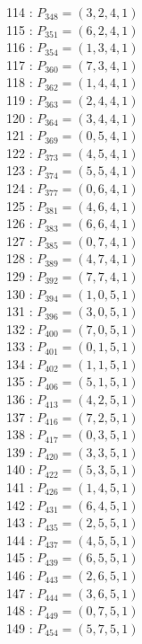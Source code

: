 \documentclass{article}
\begin{document}
{\begin{multicols}{3}
114 : $P_{348}=( 3, 2, 4, 1 )$\\
115 : $P_{351}=( 6, 2, 4, 1 )$\\
116 : $P_{354}=( 1, 3, 4, 1 )$\\
117 : $P_{360}=( 7, 3, 4, 1 )$\\
118 : $P_{362}=( 1, 4, 4, 1 )$\\
119 : $P_{363}=( 2, 4, 4, 1 )$\\
120 : $P_{364}=( 3, 4, 4, 1 )$\\
121 : $P_{369}=( 0, 5, 4, 1 )$\\
122 : $P_{373}=( 4, 5, 4, 1 )$\\
123 : $P_{374}=( 5, 5, 4, 1 )$\\
124 : $P_{377}=( 0, 6, 4, 1 )$\\
125 : $P_{381}=( 4, 6, 4, 1 )$\\
126 : $P_{383}=( 6, 6, 4, 1 )$\\
127 : $P_{385}=( 0, 7, 4, 1 )$\\
128 : $P_{389}=( 4, 7, 4, 1 )$\\
129 : $P_{392}=( 7, 7, 4, 1 )$\\
130 : $P_{394}=( 1, 0, 5, 1 )$\\
131 : $P_{396}=( 3, 0, 5, 1 )$\\
132 : $P_{400}=( 7, 0, 5, 1 )$\\
133 : $P_{401}=( 0, 1, 5, 1 )$\\
134 : $P_{402}=( 1, 1, 5, 1 )$\\
135 : $P_{406}=( 5, 1, 5, 1 )$\\
136 : $P_{413}=( 4, 2, 5, 1 )$\\
137 : $P_{416}=( 7, 2, 5, 1 )$\\
138 : $P_{417}=( 0, 3, 5, 1 )$\\
139 : $P_{420}=( 3, 3, 5, 1 )$\\
140 : $P_{422}=( 5, 3, 5, 1 )$\\
141 : $P_{426}=( 1, 4, 5, 1 )$\\
142 : $P_{431}=( 6, 4, 5, 1 )$\\
143 : $P_{435}=( 2, 5, 5, 1 )$\\
144 : $P_{437}=( 4, 5, 5, 1 )$\\
145 : $P_{439}=( 6, 5, 5, 1 )$\\
146 : $P_{443}=( 2, 6, 5, 1 )$\\
147 : $P_{444}=( 3, 6, 5, 1 )$\\
148 : $P_{449}=( 0, 7, 5, 1 )$\\
149 : $P_{454}=( 5, 7, 5, 1 )$\\

\end{multicols}}
\end{document}
